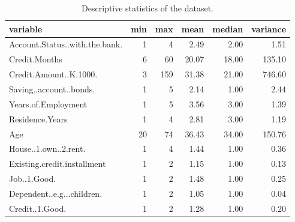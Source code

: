\begin{table}[ht]
\centering
\begin{tabular}{lrrrrr}
  \hline
variable & min & max & mean & median & variance \\ 
  \hline
Account.Status..with.the.bank. &   1 &   4 & 2.49 & 2.00 & 1.51 \\ 
  Credit.Months &   6 &  60 & 20.07 & 18.00 & 135.10 \\ 
  Credit.Amount..K.1000. &   3 & 159 & 31.38 & 21.00 & 746.60 \\ 
  Saving..account..bonds. &   1 &   5 & 2.14 & 1.00 & 2.44 \\ 
  Years.of.Employment &   1 &   5 & 3.56 & 3.00 & 1.39 \\ 
  Residence.Years &   1 &   4 & 2.81 & 3.00 & 1.19 \\ 
  Age &  20 &  74 & 36.43 & 34.00 & 150.76 \\ 
  House..1.own..2.rent. &   1 &   4 & 1.44 & 1.00 & 0.36 \\ 
  Existing.credit.installment &   1 &   2 & 1.15 & 1.00 & 0.13 \\ 
  Job..1.Good. &   1 &   2 & 1.48 & 1.00 & 0.25 \\ 
  Dependent..e.g...children. &   1 &   2 & 1.05 & 1.00 & 0.04 \\ 
  Credit..1.Good. &   1 &   2 & 1.28 & 1.00 & 0.20 \\ 
   \hline
\end{tabular}
\caption{Descriptive statistics of the dataset.} 
\label{tab:summary_stats}
\end{table}
